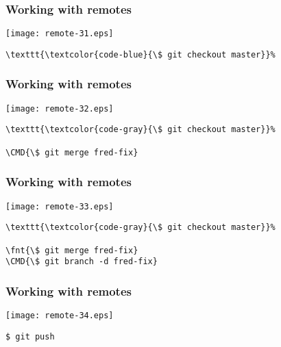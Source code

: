\documentclass[english]{beamer}
\newcommand{\CMD}[1]{%
\texttt{\textcolor{code-blue}{#1}}%
}
\newcommand{\fnt}[1]{%
\texttt{\textcolor{code-gray}{#1}}%
}
\begin{document}
\begin{frame}[fragile]
\frametitle{Working with remotes}

\texttt{[image: remote-31.eps]}

\begin{Verbatim}[commandchars=\\\{\}]
\CMD{\$ git checkout master}
\end{Verbatim}

\vspace{\textheight}
\end{frame}

\begin{frame}[fragile]
\frametitle{Working with remotes}

\texttt{[image: remote-32.eps]}

\begin{Verbatim}[commandchars=\\\{\}]
\fnt{\$ git checkout master}
\CMD{\$ git merge fred-fix}
\end{Verbatim}

\vspace{\textheight}
\end{frame}

\begin{frame}[fragile]
\frametitle{Working with remotes}

\texttt{[image: remote-33.eps]}

\begin{Verbatim}[commandchars=\\\{\}]
\fnt{\$ git checkout master}
\fnt{\$ git merge fred-fix}
\CMD{\$ git branch -d fred-fix}
\end{Verbatim}

\vspace{\textheight}
\end{frame}

\begin{frame}[fragile]
\frametitle{Working with remotes}

\texttt{[image: remote-34.eps]}

\begin{center}
\CMD{\$ git push}
\end{center}

\vspace{\textheight}
\end{frame}
\end{document}
